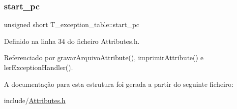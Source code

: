 \mbox{\label{structT__exception__table_a89ad17b9f257aa9589ed07bfaa263005}} 
\subsubsection{\texorpdfstring{start\+\_\+pc}{start\_pc}}
{\footnotesize\ttfamily unsigned short T\+\_\+exception\+\_\+table\+::start\+\_\+pc}



Definido na linha 34 do ficheiro Attributes.\+h.



Referenciado por gravar\+Arquivo\+Attribute(), imprimir\+Attribute() e ler\+Exception\+Handler().



A documentação para esta estrutura foi gerada a partir do seguinte ficheiro\+:\begin{DoxyCompactItemize}
\item 
include/\hyperlink{Attributes_8h}{Attributes.\+h}\end{DoxyCompactItemize}
